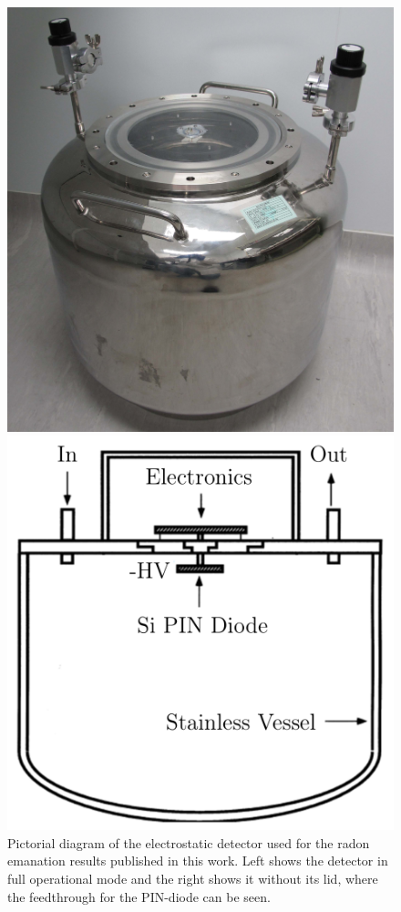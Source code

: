 \begin{figure}[h!]
    \includegraphics[scale=0.3]{Chapter_4/Figures/electrostatic_detector_2.png}
    \caption[Pictorial diagram of the electrostatic detector used for the radon emanation results published in this work.]
    {Pictorial diagram of the electrostatic detector used for the radon emanation results published in this work. Left shows the detector in full operational mode and the right shows it without its lid, where the feedthrough for the PIN-diode can be seen.}
    \label{fig:elecrostatic_detector}
    \vspace{2cm}
    \includegraphics[scale=0.5]{Chapter_4/Figures/electrostatic_detector_schematic.png}

\end{figure}
